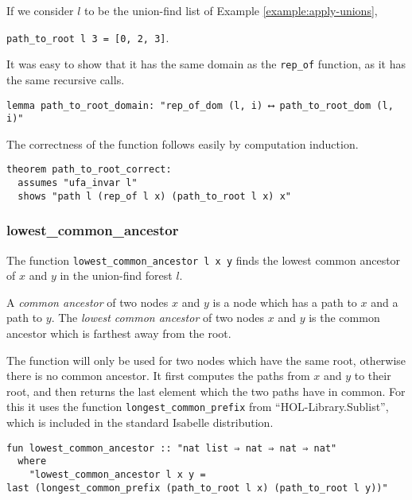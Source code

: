 \begin{exmp}
If we consider $l$ to be the union-find list of Example \ref{example:apply-unions},

\lstinline|path_to_root l 3 = [0, 2, 3]|.
\end{exmp}

It was easy to show that it has the same domain as the \lstinline{rep_of} function, as it has the same recursive calls.

\begin{lstlisting}
lemma path_to_root_domain: "rep_of_dom (l, i) ⟷ path_to_root_dom (l, i)"
\end{lstlisting}

The correctness of the function follows easily by computation induction.

\begin{lstlisting}
theorem path_to_root_correct:
  assumes "ufa_invar l"
  shows "path l (rep_of l x) (path_to_root l x) x"
\end{lstlisting}

\subsubsection{lowest\_common\_ancestor}

The function \lstinline{lowest_common_ancestor l x y} finds the lowest common ancestor of $x$ and $y$ in the union-find forest $l$.

\begin{definition}
A \emph{common ancestor} of two nodes $x$ and $y$ is a node which has a path to $x$ and a path to $y$.
The \emph{lowest common ancestor} of two nodes $x$ and $y$ is the common ancestor which is farthest away from the root.
\end{definition}

The function will only be used for two nodes which have the same root, otherwise there is no common ancestor. It first computes the paths from $x$ and $y$ to their root, and then returns the last element which the two paths have in common. For this it uses the function \lstinline{longest_common_prefix} from ``HOL-Library.Sublist'', which is included in the standard Isabelle distribution.

\begin{lstlisting}
fun lowest_common_ancestor :: "nat list ⇒ nat ⇒ nat ⇒ nat"
  where
    "lowest_common_ancestor l x y =
last (longest_common_prefix (path_to_root l x) (path_to_root l y))"
\end{lstlisting}

